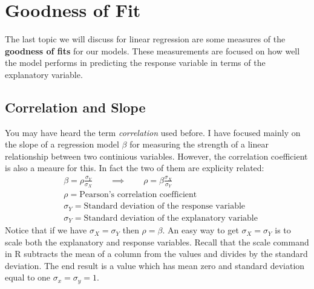 \documentclass[
]{book}
\newenvironment{Shaded}{\begin{snugshade}}{\end{snugshade}}
\newcommand{\CommentTok}[1]{\textcolor[rgb]{0.56,0.35,0.01}{\textit{#1}}}
\newcommand{\DecValTok}[1]{\textcolor[rgb]{0.00,0.00,0.81}{#1}}
\newcommand{\FunctionTok}[1]{\textcolor[rgb]{0.00,0.00,0.00}{#1}}
\newcommand{\NormalTok}[1]{#1}
\newcommand{\OtherTok}[1]{\textcolor[rgb]{0.56,0.35,0.01}{#1}}
\newcommand{\SpecialCharTok}[1]{\textcolor[rgb]{0.00,0.00,0.00}{#1}}
\theoremstyle{definition}
\theoremstyle{definition}
\theoremstyle{definition}
\theoremstyle{definition}
\theoremstyle{remark}
\begin{document}
\hypertarget{goodness-of-fit}{%
\section{Goodness of Fit}\label{goodness-of-fit}}

The last topic we will discuss for linear regression are some measures of the \textbf{goodness of fits} for our models. These measurements are focused on how well the model performs in predicting the response variable in terms of the explanatory variable.

\hypertarget{correlation-and-slope}{%
\subsection{Correlation and Slope}\label{correlation-and-slope}}

You may have heard the term \emph{correlation} used before. I have focused mainly on the slope of a regression model \(\beta\) for measuring the strength of a linear relationship between two continious variables. However, the correlation coefficient is also a meaure for this. In fact the two of them are explicity related:
\[
\begin{aligned}
& \beta=\rho \frac{\sigma_Y}{\sigma_X} \qquad \implies \qquad \rho=\beta \frac{\sigma_X}{\sigma_Y} \\
&\rho=\text{Pearson's correlation coefficient} \\
&\sigma_Y=\text{Standard deviation of the response variable} \\
&\sigma_Y=\text{Standard deviation of the explanatory variable}
\end{aligned}
\]
Notice that if we have \(\sigma_X=\sigma_Y\) then \(\rho=\beta\). An easy way to get \(\sigma_X=\sigma_Y\) is to scale both the explanatory and response variables. Recall that the scale command in R subtracts the mean of a column from the values and divides by the standard deviation. The end result is a value which has mean zero and standard deviation equal to one \(\sigma_x=\sigma_y=1\).

\begin{Shaded}
\end{Shaded}
\end{document}
